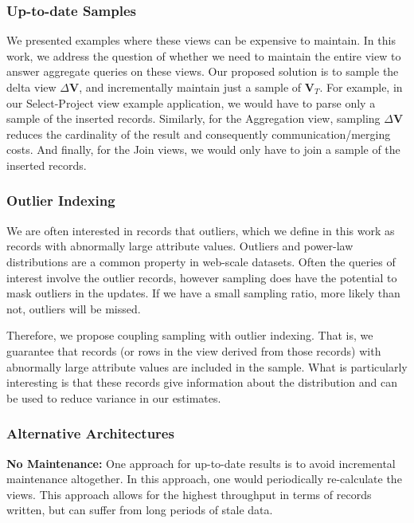 \subsubsection{Up-to-date Samples}
We presented examples where these views can be expensive to maintain.
In this work, we address the question of whether we need to maintain
the entire view to answer aggregate queries on these views. Our proposed
solution is to sample the delta view $\Delta\textbf{V}$, and incrementally
maintain just a sample of $\textbf{V}_{T}$. For example, in our Select-Project
view example application, we would have to parse only a sample of
the inserted records. Similarly, for the Aggregation view, sampling
$\Delta\textbf{V}$ reduces the cardinality of the result and consequently
communication/merging costs. And finally, for the Join views, we would
only have to join a sample of the inserted records. 

\subsubsection{Outlier Indexing}
We are often interested in records that outliers, 
which we define in this work as records with abnormally large attribute values.
Outliers and power-law distributions are a common property in web-scale datasets.
Often the queries of interest involve the outlier records, however sampling does 
have the potential to mask outliers in the updates.
If we have a small sampling ratio, more likely than not, outliers will be missed.

Therefore, we propose coupling sampling with outlier indexing. 
That is, we guarantee that records (or rows in the view derived from those records) 
with abnormally large attribute values are included in the sample.
What is particularly interesting is that these records give information about the distribution 
and can be used to reduce variance in our estimates.

\subsubsection{Alternative Architectures}
\noindent\textbf{No Maintenance: }
One approach for up-to-date results is to avoid incremental maintenance altogether.
In this approach, one would periodically re-calculate the views.
This approach allows for the highest throughput in terms of records written, but can
suffer from long periods of stale data.

\vspace{1em}

